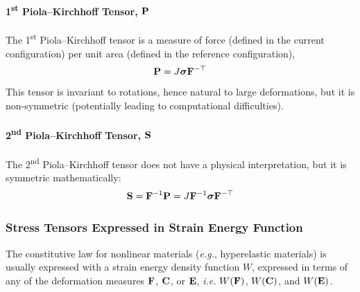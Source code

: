 \documentclass[12pt, a4paper]{article}
\numberwithin{equation}{section}
\begin{document}
\paragraph{1\textsuperscript{st} Piola--Kirchhoff Tensor, $\mathbf{P}$} The 1\textsuperscript{st} Piola--Kirchhoff tensor is a measure of force (defined in the current configuration) per unit area (defined in the reference configuration),
\begin{equation}
    \mathbf{P} = J \boldsymbol{\sigma} \mathbf{F}^{-\top}
\end{equation}
This tensor is invariant to rotations, hence natural to large deformations, but it is non-symmetric (potentially leading to computational difficulties).

\paragraph{2\textsuperscript{nd} Piola--Kirchhoff Tensor, $\mathbf{S}$} The 2\textsuperscript{nd} Piola--Kirchhoff tensor does not have a physical interpretation, but it is symmetric mathematically:
\begin{equation}
    \mathbf{S} = \mathbf{F}^{-1} \mathbf{P} = J \mathbf{F}^{-1} \boldsymbol{\sigma} \mathbf{F}^{-\top}
\end{equation}

\subsubsection{Stress Tensors Expressed in Strain Energy Function}
The constitutive law for nonlinear materials (\textit{e.g.}, hyperelastic materials) is usually expressed with a strain energy density function $W$, expressed in terms of any of the deformation measures $\mathbf{F}$, $\mathbf{C}$, or $\mathbf{E}$, \textit{i.e.} $W(\mathbf{F})$, $W(\mathbf{C})$, and $W(\mathbf{E})$. \\
\end{document}
